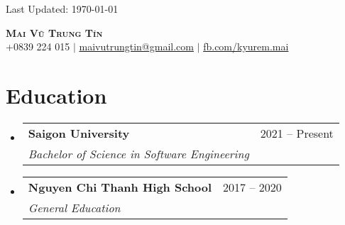 \documentclass[letterpaper,11pt]{article}
\makeatletter
\newcommand{\resumeSubheading}[4]{
  \vspace{-2pt}\item
    \begin{tabular*}{0.97\textwidth}[t]{l@{\extracolsep{\fill}}r}
      \textbf{#1} & #2 \\
      \textit{\small#3} & \textit{\small #4} \\
    \end{tabular*}\vspace{-7pt}
}
\newcommand{\resumeSubHeadingListStart}{\begin{itemize}[leftmargin=0.15in, label={}]}
\newcommand{\resumeSubHeadingListEnd}{\end{itemize}}
\makeatother
\begin{document}
\begin{flushright}
  \color{gray}
  \small Last Updated: \today
\end{flushright}

\vspace{-10pt}
\begin{center}
    \textbf{\LARGE \scshape Mai Vũ Trung Tín} \\ \vspace{6pt}
    \small 
     +0839 224 015 $|$
     \href{mailto:maivutrungtin@gmail.com}{maivutrungtin@gmail.com} $|$
     \href{https://facebook.com/kyurem.mai}{fb.com/kyurem.mai}
\end{center}

\section{Education}
  \resumeSubHeadingListStart
    \resumeSubheading
      {Saigon University}{2021 -- Present}
      {Bachelor of Science in Software Engineering}{}
      \vspace{-4pt}
      
    \resumeSubheading
      {Nguyen Chi Thanh High School}{2017 -- 2020}
      {General Education}{}
  \resumeSubHeadingListEnd

\end{document}
